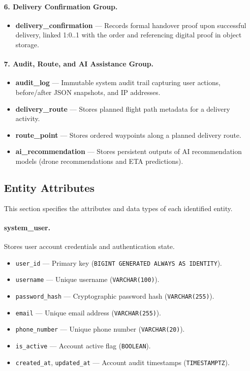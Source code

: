 \paragraph{6. Delivery Confirmation Group.}
\begin{itemize}
    \item \textbf{delivery\_confirmation} — Records formal handover proof upon successful delivery, linked 1:0..1 with the order and referencing digital proof in object storage.
\end{itemize}

\paragraph{7. Audit, Route, and AI Assistance Group.}
\begin{itemize}
    \item \textbf{audit\_log} — Immutable system audit trail capturing user actions, before/after JSON snapshots, and IP addresses.
    \item \textbf{delivery\_route} — Stores planned flight path metadata for a delivery activity.
    \item \textbf{route\_point} — Stores ordered waypoints along a planned delivery route.
    \item \textbf{ai\_recommendation} — Stores persistent outputs of AI recommendation models (drone recommendations and ETA predictions).
\end{itemize}

\subsection{Entity Attributes}\label{s:attributes}

This section specifies the attributes and data types of each identified entity.

\paragraph{system\_user.}
Stores user account credentials and authentication state.
\begin{itemize}
    \item \texttt{user\_id} — Primary key (\texttt{BIGINT GENERATED ALWAYS AS IDENTITY}).
    \item \texttt{username} — Unique username (\texttt{VARCHAR(100)}).
    \item \texttt{password\_hash} — Cryptographic password hash (\texttt{VARCHAR(255)}).
    \item \texttt{email} — Unique email address (\texttt{VARCHAR(255)}).
    \item \texttt{phone\_number} — Unique phone number (\texttt{VARCHAR(20)}).
    \item \texttt{is\_active} — Account active flag (\texttt{BOOLEAN}).
    \item \texttt{created\_at}, \texttt{updated\_at} — Account audit timestamps (\texttt{TIMESTAMPTZ}).
\end{itemize}

